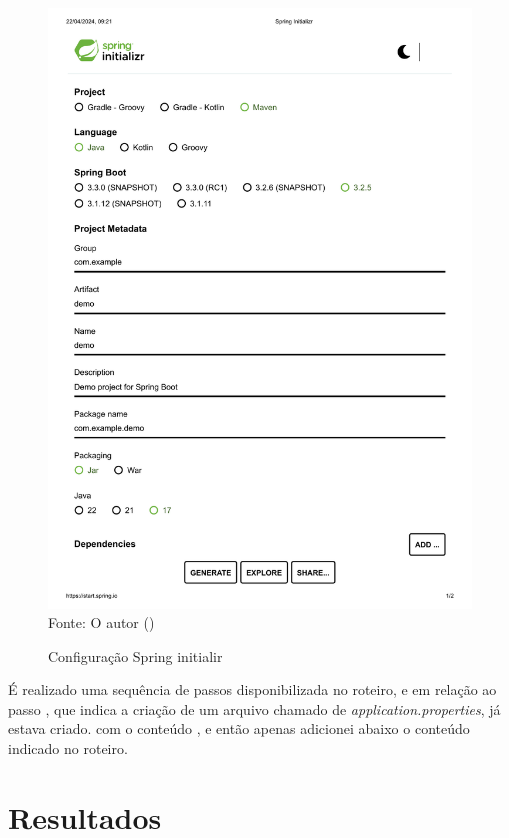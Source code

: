 \begin{figure}[H]
\center
  \caption{Configuração Spring initialir}
  \includegraphics[scale=0.6]{figure/Spring Initializr.pdf}
  \label{fig:spring}
  \flushleft %
    {\fontsize{10pt}{\baselineskip}\selectfont
    Fonte: O autor (\the\year) }
\end{figure}


\par É realizado uma sequência de passos disponibilizada no roteiro, e em relação ao passo , que indica a criação de um arquivo chamado de \textit{application.properties}, já estava criado. com o conteúdo , e então apenas adicionei abaixo o conteúdo indicado no roteiro.



\section{Resultados}




